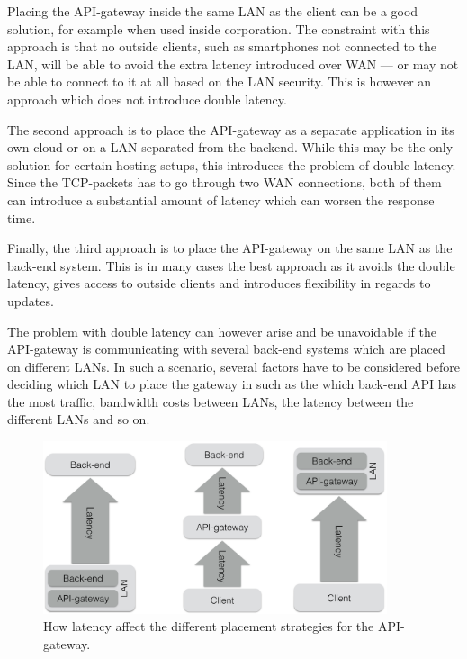 \documentclass{cslthse-msc}
\begin{document}
Placing the API-gateway inside the same LAN as the client can be a good solution, for example when used inside corporation. The constraint with this approach is that no outside clients, such as smartphones not connected to the LAN, will be able to avoid the extra latency introduced over WAN --- or may not be able to connect to it at all based on the LAN security. This is however an approach which does not introduce double latency.

The second approach is to place the API-gateway as a separate application in its own cloud or on a LAN separated from the backend. While this may be the only solution for certain hosting setups, this introduces the problem of double latency. Since the TCP-packets has to go through two WAN connections, both of them can introduce a substantial amount of latency which can worsen the response time.

Finally, the third approach is to place the API-gateway on the same LAN as the back-end system. This is in many cases the best approach as it avoids the double latency, gives access to outside clients and introduces flexibility in regards to updates. 

The problem with double latency can however arise and be unavoidable if the API-gateway is communicating with several back-end systems which are placed on different LANs. In such a scenario, several factors have to be considered before deciding which LAN to place the gateway in such as the which back-end API has the most traffic, bandwidth costs between LANs, the latency between the different LANs and so on.

\begin{figure}[H]
  \centering
    \begin{center}
      \includegraphics[width=0.9\textwidth]{images/api_gateway_latency.png}
    \end{center}
  \caption{How latency affect the different placement strategies for the API-gateway.}
\end{figure}
\end{document}
